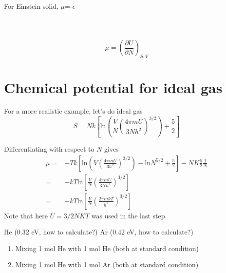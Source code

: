 \begin{figure}[h]
\centering
{}
\end{figure}

For Einstein solid, $\mu$=-$\epsilon$\\\\\\\
\begin{equation} \mu = (\frac{\partial U}{\partial N})_{S,V}  \end{equation}


\section{Chemical potential for ideal gas}

For a more realistic example, let's do ideal gas 
\begin{equation} \label{entropy} 
S = Nk[\text{ln}(\frac{V}{N} (\frac{4\pi m U}{3Nh^2})^{3/2}) + \frac{5}{2}]
\end{equation}

Differentiating with respect to $N$ gives
\begin{equation}
\begin{split}
\mu =& -T{ k[\text{ln} (V (\frac{4\pi mU}{3h^2})^{3/2} )  - \text{ln}N^{5/2} + \frac{5}{2} ] - NK\frac{5}{2}\frac{1}{N} }\\
    =& -kT\text{ln}[\frac{V}{N} (\frac{4{\pi} mU}  {3Nh^2})^{3/2} ]\\
    =& -kT\text{ln}[\frac{V}{N} (\frac{2{\pi} mkT} {h^2})^{3/2} ]
\end{split}
\end{equation}
Note that here $U = 3/2NKT$ was used in the last step.

He (0.32 eV, how to calculate?)
Ar (0.42 eV, how to calculate?)


\begin{enumerate}
\item Mixing 1 mol He with 1 mol He (both at standard condition)
\item Mixing 1 mol He with 1 mol Ar (both at standard condition)
\end{enumerate}


